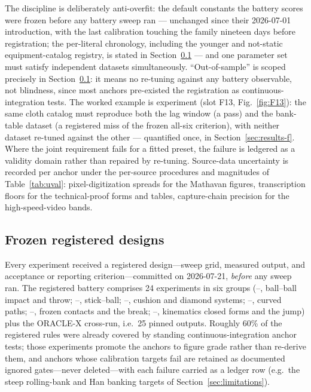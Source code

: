 The discipline is deliberately anti-overfit: the default constants the
battery scores were frozen before any battery sweep ran --- unchanged
since their 2026-07-01 introduction, with the last calibration touching
the family nineteen days before registration; the per-literal
chronology, including the younger and not-static equipment-catalog
registry, is stated in Section~\ref{sec:methodology-registration} ---
and one parameter set must satisfy independent datasets simultaneously. ``Out-of-sample'' is scoped precisely in
Section~\ref{sec:methodology-registration}: it means no re-tuning against
any battery observable, not blindness, since most anchors pre-existed the
registration as continuous-integration tests. The worked example is
experiment  (slot F13, Fig.~\ref{fig:F13}): the same cloth
catalog must reproduce both the lag window (a pass) and the bank-table
dataset (a registered miss of the frozen all-six criterion), with
neither dataset re-tuned against the other --- quantified once, in
Section~\ref{sec:results-f}. Where the joint requirement fails for a
fitted preset, the failure is ledgered as a validity domain rather than
repaired by re-tuning. Source-data
uncertainty is recorded per anchor under the per-source procedures and
magnitudes of Table~\ref{tab:uval}: pixel-digitization spreads for the
Mathavan figures, transcription floors for the technical-proof forms and
tables, capture-chain precision for the high-speed-video bands.

\subsection{Frozen registered designs}
\label{sec:methodology-registration}

Every experiment received a registered design---sweep grid, measured output,
and acceptance or reporting criterion---committed on 2026-07-21,
\emph{before} any sweep ran. The registered battery comprises 24 experiments
in six groups (--, ball--ball impact and throw;
--, stick--ball; --, cushion and
diamond systems; --, curved paths;
--, frozen contacts and the break;
--, kinematics closed forms and the jump) plus the
ORACLE-X cross-run, i.e.\ 25 pinned outputs. Roughly 60\% of the registered
rules were already covered by standing continuous-integration anchor tests;
those experiments promote the anchors to figure grade rather than re-derive
them, and anchors whose calibration targets fail are retained as documented
ignored gates---never deleted---with each failure carried as a ledger row
(e.g.\ the steep rolling-bank and Han banking targets of
Section~\ref{sec:limitations}).

